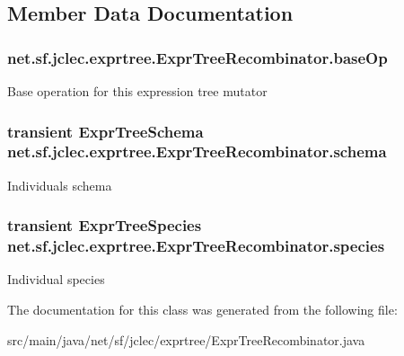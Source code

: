 \subsection{Member Data Documentation}
\hypertarget{classnet_1_1sf_1_1jclec_1_1exprtree_1_1_expr_tree_recombinator_ad70aa987e25652b6bdde419e9cbdf05d}{
\subsubsection[{base\-Op}]{ net.\-sf.\-jclec.\-exprtree.\-Expr\-Tree\-Recombinator.\-base\-Op\hspace{0.3cm}{\ttfamily [protected]}}}\label{classnet_1_1sf_1_1jclec_1_1exprtree_1_1_expr_tree_recombinator_ad70aa987e25652b6bdde419e9cbdf05d}
Base operation for this expression tree mutator \hypertarget{classnet_1_1sf_1_1jclec_1_1exprtree_1_1_expr_tree_recombinator_a4702677649a2ad046c72d84bd6a091f7}{
\subsubsection[{schema}]{\setlength{\rightskip}{0pt plus 5cm}transient {\bf Expr\-Tree\-Schema} net.\-sf.\-jclec.\-exprtree.\-Expr\-Tree\-Recombinator.\-schema\hspace{0.3cm}{\ttfamily [protected]}}}\label{classnet_1_1sf_1_1jclec_1_1exprtree_1_1_expr_tree_recombinator_a4702677649a2ad046c72d84bd6a091f7}
Individuals schema \hypertarget{classnet_1_1sf_1_1jclec_1_1exprtree_1_1_expr_tree_recombinator_a5b2361b34daef53864f4c0486835f5b6}{
\subsubsection[{species}]{\setlength{\rightskip}{0pt plus 5cm}transient {\bf Expr\-Tree\-Species} net.\-sf.\-jclec.\-exprtree.\-Expr\-Tree\-Recombinator.\-species\hspace{0.3cm}{\ttfamily [protected]}}}\label{classnet_1_1sf_1_1jclec_1_1exprtree_1_1_expr_tree_recombinator_a5b2361b34daef53864f4c0486835f5b6}
Individual species 

The documentation for this class was generated from the following file\-:\begin{DoxyCompactItemize}
\item 
src/main/java/net/sf/jclec/exprtree/Expr\-Tree\-Recombinator.\-java\end{DoxyCompactItemize}
